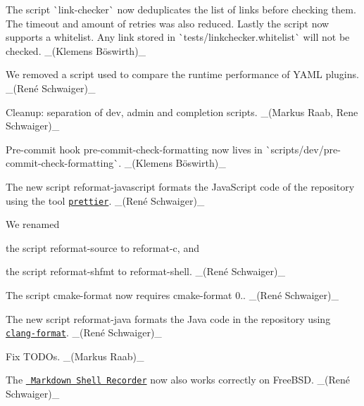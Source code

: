 \begin{DoxyItemize}
\item The script \`{}link-\/checker\`{} now deduplicates the list of links before checking them. The timeout and amount of retries was also reduced. Lastly the script now supports a whitelist. Any link stored in \`{}tests/linkchecker.whitelist\`{} will not be checked. \+\_\+(Klemens Böswirth)\+\_\+
\item We removed a script used to compare the runtime performance of Y\+A\+ML plugins. \+\_\+(René Schwaiger)\+\_\+
\item Cleanup\+: separation of dev, admin and completion scripts. \+\_\+(\+Markus Raab, Rene Schwaiger)\+\_\+
\item Pre-\/commit hook {\ttfamily pre-\/commit-\/check-\/formatting} now lives in \`{}scripts/dev/pre-\/commit-\/check-\/formatting\`{}. \+\_\+(Klemens Böswirth)\+\_\+
\item The new script reformat-\/javascript formats the Java\+Script code of the repository using the tool \href{https://prettier.io}{\texttt{ {\ttfamily prettier}}}. \+\_\+(René Schwaiger)\+\_\+
\item We renamed
\begin{DoxyItemize}
\item the script {\ttfamily reformat-\/source} to {\ttfamily reformat-\/c}, and
\item the script {\ttfamily reformat-\/shfmt} to {\ttfamily reformat-\/shell}. \+\_\+(René Schwaiger)\+\_\+
\end{DoxyItemize}
\item The script cmake-\/format now requires {\ttfamily cmake-\/format} 0.. \+\_\+(René Schwaiger)\+\_\+
\item The new script reformat-\/java formats the Java code in the repository using \href{https://clang.llvm.org/docs/ClangFormat.html}{\texttt{ {\ttfamily clang-\/format}}}. \+\_\+(René Schwaiger)\+\_\+
\end{DoxyItemize}


\begin{DoxyItemize}
\item Fix T\+O\+D\+Os. \+\_\+(\+Markus Raab)\+\_\+
\item The \href{https://master.libelektra.org/tests/shell/shell_recorder/tutorial_wrapper}{\texttt{ Markdown Shell Recorder}} now also works correctly on Free\+B\+SD. \+\_\+(René Schwaiger)\+\_\+
\end{DoxyItemize}


